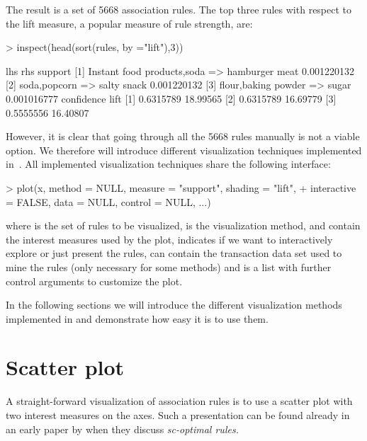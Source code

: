 \documentclass[nojss]{jss}
\begin{document}
The result is a set of 5668 association rules.
The top three rules
with respect to the lift measure,
a popular measure of rule strength, are:

\begin{Schunk}
\begin{Sinput}
> inspect(head(sort(rules, by ="lift"),3))
\end{Sinput}
\begin{Soutput}
    lhs                             rhs              support    
[1] {Instant food products,soda} => {hamburger meat} 0.001220132
[2] {soda,popcorn}               => {salty snack}    0.001220132
[3] {flour,baking powder}        => {sugar}          0.001016777
    confidence lift    
[1] 0.6315789  18.99565
[2] 0.6315789  16.69779
[3] 0.5555556  16.40807
\end{Soutput}
\end{Schunk}

However, it is clear that going through all the 5668 rules
manually is not a viable
option. We therefore will introduce different visualization techniques
implemented in~.
All implemented visualization techniques share the
following interface:

\begin{Schunk}
\begin{Sinput}
> plot(x, method = NULL, measure = "support", shading = "lift",
+   interactive = FALSE, data = NULL, control = NULL, ...)
\end{Sinput}
\end{Schunk}

where  is the set of rules to be visualized,
 is the visualization method,
 and  contain the interest measures
used by the plot,
 indicates if we want to interactively
explore or just present the rules,
 can contain the transaction data set used to mine the
rules (only necessary for some methods) and  is a list
with further control arguments to customize the plot.

In the following sections we will introduce the different visualization
methods implemented in  and demonstrate how easy it is to
use them.

\section{Scatter plot}
\label{sec:scatter}

A straight-forward visualization of association rules is to use a scatter plot
with two interest measures on the axes.
Such a presentation can be found already in an early paper by
\cite{arulesViz:Bayardo:1999} when they discuss \emph{sc-optimal rules.}
\end{document}

